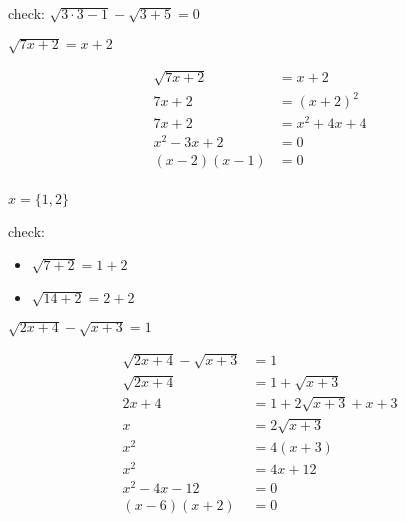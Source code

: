 \documentclass[fleqn,addpoints]{exam}
\begin{document}
\begin{questions}
\begin{solution}[5 cm]
check: \( \sqrt{3 \cdot 3 -1}  - \sqrt{3+5} = 0\)

\end{solution}



\question[7] \( \sqrt{7x+2} = x + 2 \)
\begin{solution}[5 cm]
\begin{align*}
  \sqrt{7x+2} &= x + 2 \\
  7x+2 &= (x + 2)^2 \\
  7x+2 &= x^2+4x+4 \\
  x^2-3x+2 &= 0 \\
  (x-2)(x-1) &= 0 \\
\end{align*}

$x = \{1, 2\}$

check: 
\begin{itemize}
  \item \( \sqrt{7+2} = 1 + 2 \)
  \item \( \sqrt{14+2} = 2 + 2 \)
\end{itemize}
\end{solution}


\question[10] \( \sqrt{2x+4} - \sqrt{x+3} = 1 \)
\label{equation:last}
\begin{solution}[7 cm]
\begin{align*}
  \sqrt{2x+4} - \sqrt{x+3} &= 1 \\
  \sqrt{2x+4}  &= 1 + \sqrt{x+3} \\
  2x+4  &= 1 + 2\sqrt{x+3} + x + 3\\
  x  &= 2\sqrt{x+3} \\
  x^2  &= 4(x+3) \\
  x^2  &= 4x+12 \\
  x^2 - 4x - 12 &= 0 \\
  (x - 6)(x+2) &= 0 \\
\end{align*}


\end{solution}
\end{questions}
\end{document}

